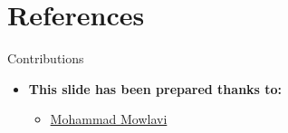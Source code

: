 \documentclass[serif, aspectratio=169]{beamer}
\begin{document}
\section{References}

\begin{frame}{Contributions}
    \begin{itemize}
        \itemsep1em
        \item \textbf{This slide has been prepared thanks to:}
        \begin{itemize}
            \itemsep1em
            \item \href{https://github.com/MohammadMow/}{Mohammad Mowlavi}
        \end{itemize}
    \end{itemize}
\end{frame}

\begin{frame}[allowframebreaks]
    
    
    \nocite{*}
\end{frame}
\end{document}

